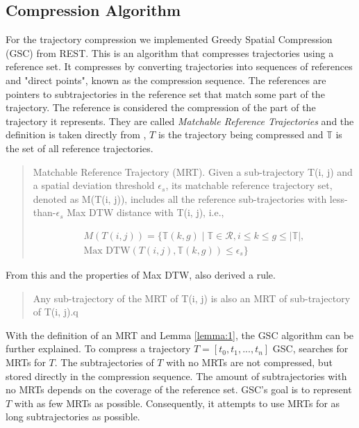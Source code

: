 \subsection{Compression Algorithm}
For the trajectory compression we implemented Greedy Spatial Compression (GSC) from REST. This is an algorithm that compresses trajectories using a reference set. It compresses by converting trajectories into sequences of references and "direct points", known as the compression sequence. The references are pointers to subtrajectories in the reference set that match some part of the trajectory. The reference is considered the compression of the part of the trajectory it represents. They are called \textit{Matchable Reference Trajectories} and the definition is taken directly from \textcite{zhao2018rest}, $T$ is the trajectory being compressed and $\mathbb{T}$ is the set of all reference trajectories.
\\
\begin{quote}
    \begin{definition}
        \label{def:mrt}
        Matchable Reference Trajectory (MRT). Given a sub-trajectory T(i, j) and a spatial deviation threshold $\epsilon_{s}$, its matchable reference trajectory set, denoted as M(T(i, j)), includes all the reference sub-trajectories with less-than-$\epsilon_{s}$ Max DTW distance with T(i, j), i.e.,
    \end{definition}
    \begin{equation}\label{eq:mrt}
        \begin{aligned}
            M(T(i,j)) = \{ \mathbb{T}(k,g) \mid \mathbb{T} \in \mathcal{R}, i \leq k \leq g \leq \left\lvert \mathbb{T} \right\rvert, \\
            \text{Max DTW}(T(i,j), \mathbb{T}(k,g)) \leq \epsilon_{s} \}
        \end{aligned}
    \end{equation}
\end{quote}

From this and the properties of Max DTW, \textcite{zhao2018rest} also derived a rule.

\begin{quote}
    \begin{lemma}\label{lemma:1}
        Any sub-trajectory of the MRT of T(i, j) is also an MRT of sub-trajectory of T(i, j).q
    \end{lemma}
\end{quote}


With the definition of an MRT and Lemma \ref{lemma:1}, the GSC algorithm can be further explained. To compress a trajectory $T = [t_0, t_1, ..., t_n]$ GSC, searches for MRTs for $T$. The subtrajectories of $T$ with no MRTs are not compressed, but stored directly in the compression sequence. The amount of subtrajectories with no MRTs depends on the coverage of the reference set. GSC's goal is to represent $T$ with as few MRTs as possible. Consequently, it attempts to use MRTs for as long subtrajectories as possible.

